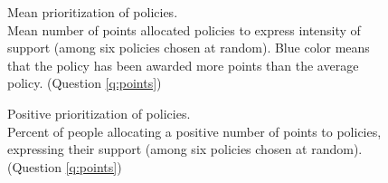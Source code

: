 \documentclass[12pt,english]{article}
\begin{document}
\begin{figure}[h!] 
    \caption[Mean prioritization of policies]{Mean prioritization of policies. \\Mean number of points allocated policies to express intensity of support (among six policies chosen at random). Blue color means that the policy has been awarded more points than the average policy. (Question \ref{q:points})}\label{fig:points}
\end{figure}

\begin{figure}[h!] 
    \caption[Positive prioritization of policies]{Positive prioritization of policies. \\ Percent of people allocating a positive number of points to policies, expressing their support (among six policies chosen at random). (Question \ref{q:points})}\label{fig:points_positive}
\end{figure}
\end{document}
